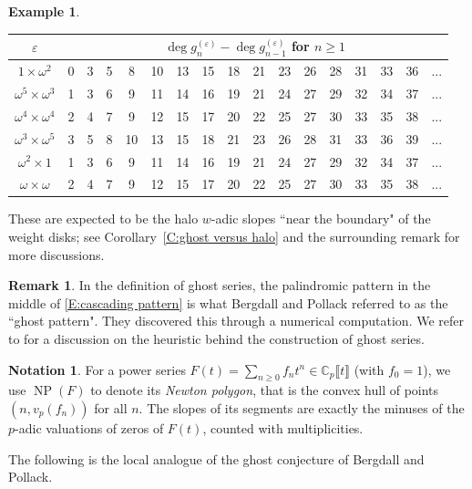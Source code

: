 \documentclass[12pt]{amsart}
\theoremstyle{definition}
\newtheorem{example}[subsection]{Example}
\newtheorem{remark}[subsection]{Remark}
\newtheorem{notation}[subsection]{Notation}
\numberwithin{equation}{subsection}
\def\CC{\mathbb{C}}
\DeclareMathOperator{\NP}{NP}
\begin{document}
\begin{example}
\begin{center}\renewcommand{\arraystretch}{1.2}
\begin{tabular}{|c|c|c|c|c|c|c|c|c|c|c|c|c|c|c|c|c|}
\hline
$\varepsilon$ & \multicolumn{16}{|c|}{$\deg g_n^{(\varepsilon)}- \deg g_{n-1}^{(\varepsilon)}$ for $n \geq 1$}
\\
\hline
$1\times \omega^2$ & 0 & 3 & 5 & 8 & 10 & 13 & 15 & 18 & 21 & 23 & 26 & 28&31&33&36 & ... \\ \hline
$\omega^5\times \omega^3$ &  1 & 3 & 6 & 9 & 11 & 14 & 16 & 19 & 21&24&27&29&32&34&37& ...
\\
 \hline
$\omega^4\times \omega^4$  & 2 & 4 & 7 & 9 & 12 &15 & 17 & 20 & 22&25&27&30&33&35&38& ...
\\ \hline
$\omega^3\times \omega^5$  &3 & 5 & 8 & 10 & 13 & 15 & 18 & 21 &23&26& 28&31&33&36&39& ...
\\ \hline
$\omega^2\times 1$ & 1 & 3 & 6 & 9 & 11 & 14 & 16 & 19 &21&24&27&29&32&34&37&...
\\ \hline
$\omega\times \omega$  & 2 & 4 & 7 & 9 & 12 &15 & 17 & 20 &22&25&27&30& 33&35&38&...
\\ \hline
\end{tabular}
\end{center}
These are expected to be the halo $w$-adic slopes ``near the boundary" of the weight disks; see Corollary~\ref{C:ghost versus halo} and the surrounding remark for more discussions.
\end{example}
\begin{remark}
\label{R:ghost pattern}
In the definition of ghost series, the palindromic pattern in the middle of \eqref{E:cascading pattern} is what Bergdall and Pollack referred to as the ``ghost pattern". They discovered this through a numerical computation. We refer to \cite[\S1]{bergdall-pollack2} for a discussion on the heuristic behind the construction of ghost series.
\end{remark}

\begin{notation}
\label{N:Newton polygon}
For a power series $F(t) = \sum_{n \geq 0} f_n t^n\in
\CC_p\llbracket t\rrbracket$ (with $f_0=1$), we use $\NP(F)$ to denote its \emph{Newton polygon}, that is the convex hull of points $(n, v_p(f_n))$ for all $n$.
The slopes of its segments are exactly the minuses of the $p$-adic valuations of zeros of $F(t)$, counted with multiplicities.
\end{notation}

The following is the local analogue of the ghost conjecture of Bergdall and Pollack.
\end{document}

